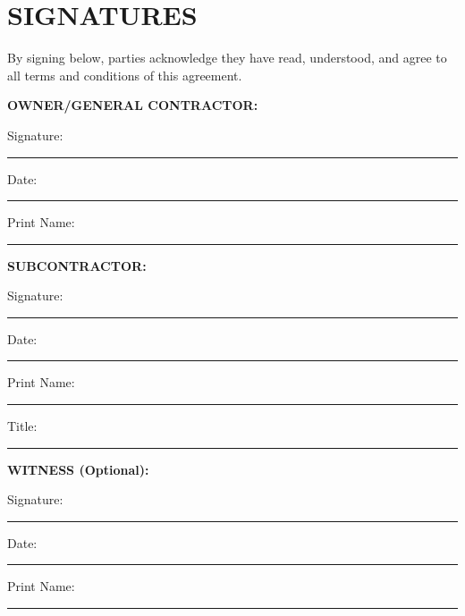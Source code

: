 \documentclass[11pt,letterpaper]{article}
\begin{document}
\vspace{12pt}

\section*{SIGNATURES}

By signing below, parties acknowledge they have read, understood, and agree to all terms and conditions of this agreement.

\vspace{12pt}

\textbf{OWNER/GENERAL CONTRACTOR:}

Signature: \rule{6cm}{0.4pt} Date: \rule{3cm}{0.4pt}

Print Name: \rule{6cm}{0.4pt}

\vspace{12pt}

\textbf{SUBCONTRACTOR:}

Signature: \rule{6cm}{0.4pt} Date: \rule{3cm}{0.4pt}

Print Name: \rule{6cm}{0.4pt}

Title: \rule{6cm}{0.4pt}

\vspace{12pt}

\textbf{WITNESS (Optional):}

Signature: \rule{6cm}{0.4pt} Date: \rule{3cm}{0.4pt}

Print Name: \rule{6cm}{0.4pt}
\end{document}
